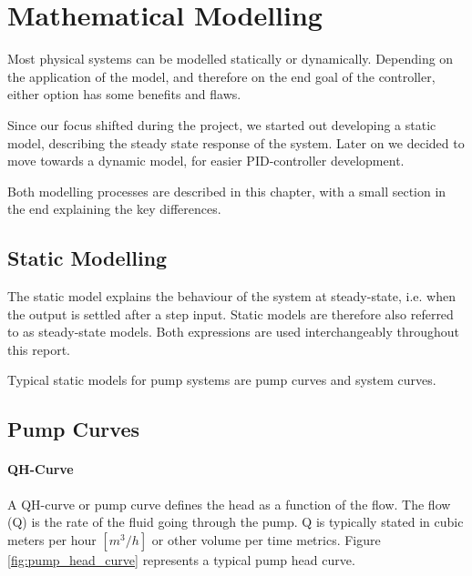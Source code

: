 \chapter{Mathematical Modelling}\label{ch:mathmodel}

Most physical systems can be modelled statically or dynamically.
Depending on the application of the model,
and therefore on the end goal of the controller,
either option has some benefits and flaws.

Since our focus shifted during the project, we started out developing a static model,
describing the steady state response of the system.
Later on we decided to move towards a dynamic model, for easier PID-controller development.

Both modelling processes are described in this chapter,
with a small section in the end explaining the key differences.
\section{Static Modelling}\label{sec:statmod}

The static model explains the behaviour of the system at steady-state,
i.e. when the output is settled after a step input.
Static models are therefore also referred to as steady-state models.
Both expressions are used interchangeably throughout this report.

Typical static models for pump systems are pump curves and system curves.
\section{Pump Curves}\label{sec:pumpcurves}
\subsubsection{QH-Curve}

A QH-curve or pump curve defines the head as a function of the flow.
The flow (Q) is the rate of the fluid going through the pump.
Q is typically stated in cubic meters per hour $[m^{3}/h]$ or other volume per time metrics.
Figure \ref{fig:pump_head_curve} represents a typical pump head curve.

